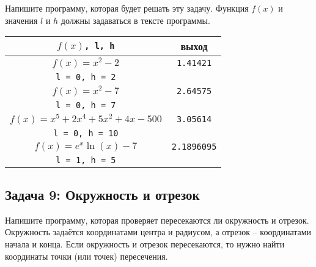 \documentclass{article}
\begin{document}
Напишите программу, которая будет решать эту задачу. Функция $f(x)$ и значения $l$ и $h$ должны задаваться в тексте программы.

\renewcommand{\arraystretch}{1.3}
\begin{center}
\begin{tabular}{ c | c }
 $f(x)$\texttt{, l, h} & выход \\ \hline
 $f(x) = x^2 - 2$  & \texttt{1.41421}  \\ 
 \texttt{l = 0, h = 2} &   \\ \hline
 $f(x) = x^2 - 7$  & \texttt{2.64575}  \\ 
 \texttt{l = 0, h = 7} &   \\ \hline
 $f(x) = x^5 + 2x^4 + 5x^2 +4x - 500$  & \texttt{3.05614}  \\ 
 \texttt{l = 0, h = 10} &   \\\hline
 $f(x) = e^x \ln(x) - 7$  & \texttt{2.1896095}  \\ 
 \texttt{l = 1, h = 5} &   \\
\end{tabular}
\end{center}
\renewcommand{\arraystretch}{1}

\subsection*{Задача 9: Окружность и отрезок}
Напишите программу, которая проверяет пересекаются ли окружность и отрезок. Окружность задаётся координатами центра и радиусом, а отрезок -- координатами начала и конца. Если окружность и отрезок пересекаются, то нужно найти координаты точки (или точек) пересечения.
\end{document}
